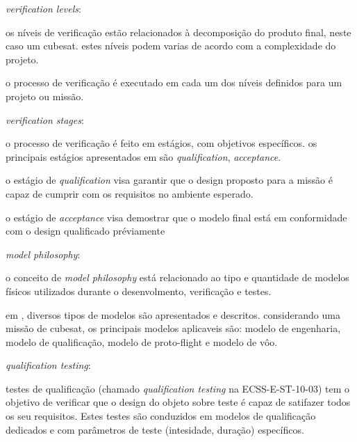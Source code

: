 \begin{alineas}
    \item \textit{verification levels}:
    \begin{alineas}
        \item os níveis de verificação estão relacionados à decomposição do produto final, neste caso um cubesat. estes níveis podem varias de acordo com a complexidade do projeto.
        \item o processo de verificação é executado em cada um dos níveis definidos para um projeto ou missão.
    \end{alineas}

    \item \textit{verification stages}:
    \begin{alineas}
        \item o processo de verificação é feito em estágios, com objetivos específicos. os principais estágios apresentados em \textcite{ecss-e-st-10-02} são \textit{qualification}, \textit{acceptance}.

        \item o estágio de \textit{qualification} visa garantir que o design proposto para a missão é capaz de cumprir com os requisitos no ambiente esperado.
        \item o estágio de \textit{acceptance} visa demostrar que o modelo final  está em conformidade com o design qualificado préviamente
    \end{alineas}

    \item \textit{model philosophy}:
    \begin{alineas}
        \item o conceito de \textit{model philosophy} está relacionado ao tipo e quantidade de modelos físicos utilizados durante o desenvolmento, verificação e testes.
        \item em \cite{ecss-e-hb-10-02}, diversos tipos de modelos são apresentados e descritos. considerando uma missão de cubesat, os principais modelos aplicaveis são: modelo de engenharia, modelo de qualificação, modelo de proto-flight e modelo de vôo.
    \end{alineas}

    \item \textit{qualification testing}:
    \begin{alineas}
        \item testes de qualificação (chamado \textit{qualification testing} na ECSS-E-ST-10-03) tem o objetivo de verificar que o design do objeto sobre teste é capaz de satifazer todos os seu requisitos. Estes testes são conduzidos em modelos de qualificação dedicados e com parâmetros de teste (intesidade, duração) específicos.
    \end{alineas}


\end{alineas}
